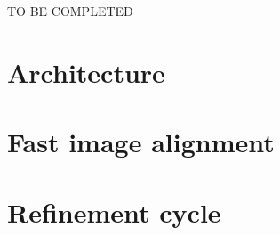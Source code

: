 \documentclass[../main.tex]{subfiles}
\begin{document}
TO BE COMPLETED

\section{Architecture}


\section{Fast image alignment}


\section{Refinement cycle}

\end{document}
